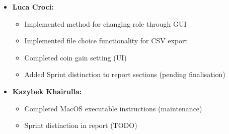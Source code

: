 \documentclass[11pt]{article}
\begin{document}
\begin{itemize}
        \item \textbf{Luca Croci:}
        \begin{itemize}
            \item Implemented method for changing role through GUI
            \item Implemented file choice functionality for CSV export
            \item Completed coin gain setting (UI)
            \item Added Sprint distinction to report sections (pending finalisation)
        \end{itemize}

        \item \textbf{Kazybek Khairulla:}
        \begin{itemize}
            \item Completed MacOS executable instructions (maintenance)
            \item Sprint distinction in report (TODO)
        \end{itemize}
    \end{itemize}
\end{document}
